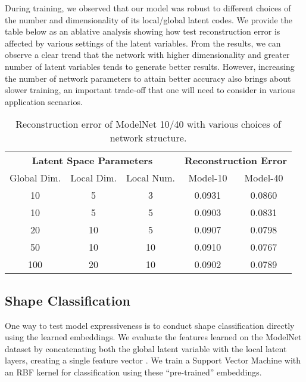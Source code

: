 \documentclass[10pt,twocolumn,letterpaper]{article}
\begin{document}
During training, we observed that our model was robust to different choices of the number and dimensionality of its local/global latent codes. We provide the table below as an ablative analysis showing how test reconstruction error is affected by various settings of the latent variables. From the results, we can observe a clear trend that the network with higher dimensionality and greater number of latent variables tends to generate better results. However, increasing the number of network parameters to attain better accuracy also brings about slower training, an important trade-off that one will need to consider in various application scenarios.

\begin{table}[ht!]
  \centering
  \small
  \setlength\tabcolsep{2pt}
        \def\arraystretch{0.9}
    \begin{tabular}{ccccc}
    \multicolumn{3}{c}{\bf Latent Space Parameters} & \multicolumn{2}{c}{\bf Reconstruction Error} \\
    Global Dim. & Local Dim. & Local Num. & Model-10 & Model-40 \\
    \midrule
    10    & 5     & 3     & 0.0931       & 0.0860 \\
    10    & 5     & 5     & 0.0903      & 0.0831\\
    20    & 10    & 5     & 0.0907      & 0.0798 \\
    50    & 10    & 10    & 0.0910      &  0.0767\\
    100   & 20    & 10    & 0.0902      &  0.0789\\
    \end{tabular}
    \caption{Reconstruction error of ModelNet 10/40 with various choices of network structure. }
\end{table}
\vspace{-0.5em}

\subsection{Shape Classification}
\label{subsec:shapeclass}
One way to test model expressiveness is to conduct shape classification directly using the learned embeddings. We evaluate the features learned on the ModelNet dataset \cite{wu20153d} by concatenating both the global latent variable with the local latent layers, creating a single feature vector . We train a Support Vector Machine with an RBF kernel for classification using these ``pre-trained'' embeddings.
\end{document}
